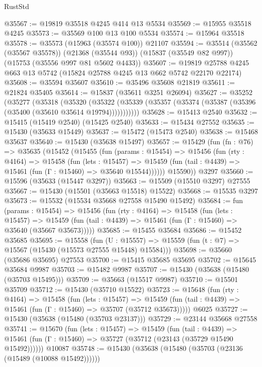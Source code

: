 \begin{lexlean}{RustStd}
\begin{coremodule}
{\begin{coremodule}
{{{{{{{{{{{{{{{{{{{{{{{{{{{{{{{{{{{{{{{{{{{{{{{{{{{{{{{{{{{{@35567 := @19819 @35518 @4245 @414 @13 @5534
@35569 := @15955 @35518 @4245
@35573 := @35569 @100 @13 @100 @5534
@35574 := @15964 @35518
@35578 := @35573 (@15963 (@35574 @100)) @21107
@35594 := @35514
    (@35562 (@35567 @35578))
    (@21368 (@35544 @93))
    (@15837 (@35549 @82 @997))
    (@15753 (@35556 @997 @81 @5602 @4433))
@35607 := @19819 @25788 @4245 @663 @13 @5742 (@15824 @25788 @4245 @13 @662 @5742 @22170 @22174)
@35608 := @35594 @35607
@35610 := @35496 @35608 @21819
@35611 := @21824 @35405
@35614 := @15837 (@35611 @3251 @26094)
@35627 := @35252
    (@35277
      (@35318
        (@35320
          (@35322 (@35339 (@35357 (@35374 (@35387 (@35396 (@35400 (@35610 @35614 @19794)))))))))))
@35628 := @15413 @2540
@35632 := @15415 (@15419 @2540) (@15425 @2540)
@35633 := @15434 @27552
@35635 := @15430 (@35633 @15449)
@35637 := @15472 (@15473 @2540)
@35638 := @15468 @35637
@35640 := @15430 (@35638 @15497)
@35657 := @15429
    (fun (fn : @76) =>
    @35635
      (@15452
        (@15455
          (fun (params : @15454) =>
          @15456
            (fun (rty : @4164) =>
            @15458
              (fun (lets : @15457) =>
              @15459 (fun (tail : @4439) => @15461 (fun (Γ : @15460) => @35640 @15544))))))
        @15590))
    @3297
@35660 := @15596 (@35633 (@15447 @3297))
@35663 := @15509 (@15510 @3297) @27555
@35667 := @15430 (@15501 (@35663 @15518) @15522)
@35668 := @15535 @3297
@35673 := @15532 (@15534 @35668 @27558 @15490 @15492)
@35684 := fun (params : @15454) =>
  @15456
    (fun (rty : @4164) =>
    @15458
      (fun (lets : @15457) =>
      @15459 (fun (tail : @4439) => @15461 (fun (Γ : @15460) => @35640 (@35667 @35673)))))
@35685 := @15455 @35684
@35686 := @15452 @35685
@35695 := @15558
    (fun (U : @15557) => @15559 (fun (t : @7) => @15567 (@15430 (@15573 @27555 @15448) @15584)))
@35698 := @35660 (@35686 @35695) @27553
@35700 := @15415 @35685 @35695
@35702 := @15645 @35684 @9987
@35703 := @15482 @9987
@35707 := @15430 (@35638 (@15480 (@35703 @15495)))
@35709 := @35663 (@15517 @9987)
@35710 := @15501 @35709
@35712 := @15430 (@35710 @15522)
@35723 := @15648
    (fun (rty : @4164) =>
    @15458
      (fun (lets : @15457) =>
      @15459 (fun (tail : @4439) => @15461 (fun (Γ : @15460) => @35707 (@35712 @35673)))))
    @6025
@35727 := @15430 (@35638 (@15480 (@35703 @23137)))
@35729 := @23144 @35668 @27558
@35741 := @15670
    (fun (lets : @15457) =>
    @15459
      (fun (tail : @4439) =>
      @15461 (fun (Γ : @15460) => @35727 (@35712 (@23143 (@35729 @15490 @15492))))))
    @10087
@35748 := @15430 (@35638 (@15480 (@35703 (@23136 (@15489 (@10088 @15492))))))
}}}}}}}}}}}}}}}}}}}}}}}}}}}}}}}}}}}}}}}}}}}}}}}}}}}}}}}}}}}}
\end{coremodule}}
\end{coremodule}
\end{lexlean}
